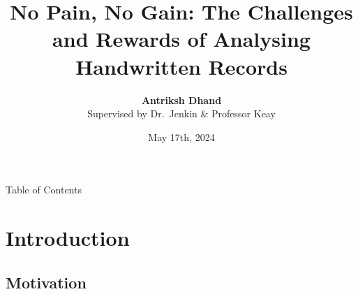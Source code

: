 \documentclass[]{beamer}
\title[Analysing Handwritten Records]{No Pain, No Gain: The Challenges and Rewards of Analysing Handwritten Records}
\author[Antriksh Dhand]{\texorpdfstring{\textbf{Antriksh Dhand}\\{\small Supervised by Dr.~Jenkin \& Professor Keay}}{\textbf{Antriksh Dhand}}}
\date{May 17th, 2024}
\institute[USYD]
{
	School of Medical Science\\
	The University of Sydney
}
\begin{document}
	\begin{frame}
	\titlepage
	\end{frame}

	\begin{frame}{Table of Contents}
	\tableofcontents
	\end{frame}

	\section{Introduction}

	\subsection{Motivation} %
\end{document}

